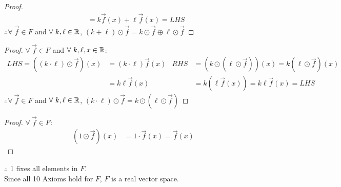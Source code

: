 \documentclass{article}
\begin{document}
\begin{enumerate}
\begin{proof}
\begin{align*}
                                                                 & = k\vec{f}(x) + \ell\vec{f}(x) = LHS
        \end{align*}
        $\therefore \forall~\vec{f} \in F$ and $\forall~k, \ell \in \mathbb{R}$, $(k + \ell) \odot \vec{f} = k \odot \vec{f} \oplus \ell \odot \vec{f}$
    \end{proof}
    \begin{proof}
        $\forall~\vec{f} \in F$ and $\forall~k, \ell, x \in \mathbb{R}$:
        \begin{align*}
            LHS = ((k \cdot \ell) \odot \vec{f})(x) & = (k \cdot \ell)\vec{f}(x) & RHS & = (k \odot (\ell \odot \vec{f}))(x) = k(\ell \odot \vec{f})(x) \\
                                                    & = k\ell\vec{f}(x)          &     & = k(\ell\vec{f}(x)) = k\ell\vec{f}(x) = LHS
        \end{align*}
        $\therefore \forall~\vec{f} \in F$ and $\forall~k, \ell \in \mathbb{R}$, $(k \cdot \ell) \odot \vec{f} = k \odot (\ell \odot \vec{f})$
    \end{proof}
    \begin{proof}
        $\forall~\vec{f} \in F$:
        \begin{align*}
            (1 \odot \vec{f})(x) & = 1\cdot\vec{f}(x) = \vec{f}(x)
        \end{align*}
    \end{proof}
    $\therefore$ 1 fixes all elements in $F$. \\
    Since all 10 Axioms hold for $F$, $F$ is a real vector space.
\end{enumerate}
\end{document}
